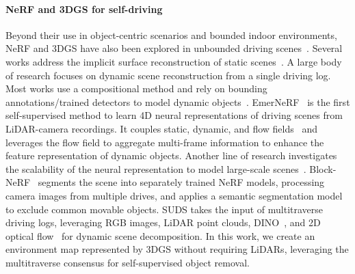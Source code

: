 \paragraph{NeRF and 3DGS for self-driving} 
Beyond their use in object-centric scenarios and bounded indoor environments, NeRF and 3DGS have also been explored in unbounded driving scenes~\cite{chen2023periodic,zhao2024tclc}. Several works address the implicit surface reconstruction of static scenes~\cite{rematas2022urban,wang2023neural,guo2023streetsurf}. A large body of research focuses on dynamic scene reconstruction from a single driving log. Most works use a compositional method and rely on bounding annotations/trained detectors to model dynamic objects~\cite{ost2021neural,xie2022s,yang2023unisim,tonderski2023neurad,zhou2023drivinggaussian,yan2024street,zhou2024hugs}. EmerNeRF~\cite{yang2023emernerf} is the first self-supervised method to learn 4D neural representations of driving scenes from LiDAR-camera recordings. It couples static, dynamic, and flow fields~\cite{muller2022instant} and leverages the flow field to aggregate multi-frame information to enhance the feature representation of dynamic objects. Another line of research investigates the scalability of the neural representation to model large-scale scenes~\cite{tancik2022block,xiangli2022bungeenerf,turki2022mega,turki2023suds,li2024nerfxl,lin2024vastgaussian}. Block-NeRF~\cite{tancik2022block} segments the scene into separately trained NeRF models, processing camera images from multiple drives, and applies a semantic segmentation model~\cite{cheng2020panoptic} to exclude common movable objects. SUDS takes the input of multitraverse driving logs, leveraging RGB images, LiDAR point clouds, DINO~\cite{caron2021emerging}, and 2D optical flow~\cite{teed2020raft} for dynamic scene decomposition. In this work, we create an environment map represented by 3DGS without requiring LiDARs, leveraging the multitraverse consensus for self-supervised object removal.


